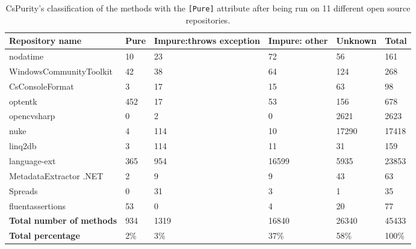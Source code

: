 \documentclass[a4paper,12pt]{article}
\begin{document}
\begin{table}[H]
  \small
  \caption{CsPurity's classification of the methods with the \texttt{[Pure]} attribute after being run on 11 different open source repositories.}
  \label{tab:results-pure-methods}
  \centering
  \begin{tabular}{|l|lp{2.8cm}p{1.4cm}l|l|}
    \hline
    \textbf{Repository name} & \textbf{Pure} & \textbf{Impure:\newline throws exception} & \textbf{Impure: other} & \textbf{Unknown} & \textbf{Total} \\
    \hline
    nodatime                & 10  & 23   & 72    & 56    & 161   \\
    WindowsCommunityToolkit & 42  & 38   & 64    & 124   & 268   \\
    CsConsoleFormat         & 3   & 17   & 15    & 63    & 98    \\
    optentk                 & 452 & 17   & 53    & 156   & 678   \\
    opencvsharp             & 0   & 2    & 0     & 2621  & 2623  \\
    nuke                    & 4   & 114  & 10    & 17290 & 17418 \\
    linq2db                 & 3   & 114  & 11    & 31    & 159   \\
    language-ext            & 365 & 954  & 16599 & 5935  & 23853 \\
    MetadataExtractor .NET  & 2   & 9    & 9     & 43    & 63    \\
    Spreads                 & 0   & 31   & 3     & 1     & 35    \\
    fluentassertions        & 53  & 0    & 4     & 20    & 77    \\
    \hline
    \rowcolor{lightgray} \textbf{Total number of methods} & 934 & 1319 & 16840 & 26340 & \cellcolor{white} 45433 \\
    \rowcolor{lightgray} \textbf{Total percentage}        & 2\% & 3\%  & 37\%  & 58\%  & \cellcolor{white} 100\% \\
    \hline
  \end{tabular}
\end{table}
\end{document}

